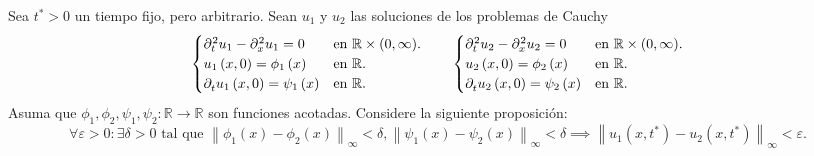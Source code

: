 Sea $t^{\ast}>0$ un tiempo fijo, pero arbitrario.
Sean $u_{1}$ y $u_{2}$ las soluciones de los problemas de Cauchy
\begin{equation*}
	\begin{cases}
		\difcp[2]{u_{1}}{t}-
		\difcp[2]{u_{1}}{x}=0  &
		\text{en }\mathbb{R}\times(0,\infty). \\
		u_{1}\left(x,0\right)=
		\phi_{1}\left(x\right) &
		\text{en }\mathbb{R}.                 \\
		\difcp{u_{1}}{t}\left(x,0\right)=
		\psi_{1}\left(x\right) &
		\text{en }\mathbb{R}.
	\end{cases}\qquad
	\begin{cases}
		\difcp[2]{u_{2}}{t}-
		\difcp[2]{u_{2}}{x}=0  &
		\text{en }\mathbb{R}\times(0,\infty). \\
		u_{2}\left(x,0\right)=
		\phi_{2}\left(x\right) &
		\text{en }\mathbb{R}.                 \\
		\difcp{u_{2}}{t}\left(x,0\right)=
		\psi_{2}\left(x\right) &
		\text{en }\mathbb{R}.
	\end{cases}
\end{equation*}
Asuma que
\begin{math}
	\phi_{1},
	\phi_{2},
	\psi_{1},
	\psi_{2}\colon\mathbb{R}\to\mathbb{R}
\end{math}
son funciones acotadas.
Considere la siguiente proposición:
\begin{equation*}
	\forall\varepsilon>0:
	\exists\delta>0
	\text{ tal que }
	{
		\left\|
		\phi_{1}\left(x\right)-
		\phi_{2}\left(x\right)
		\right\|
	}_{\infty}<
	\delta,
	{
			\left\|
			\psi_{1}\left(x\right)-
			\psi_{2}\left(x\right)
			\right\|}_{\infty}<
	\delta
	\implies
	{
		\left\|
		u_{1}\left(x,t^{\ast}\right)-
		u_{2}\left(x,t^{\ast}\right)
		\right\|
	}_{\infty}<
	\varepsilon.
\end{equation*}


